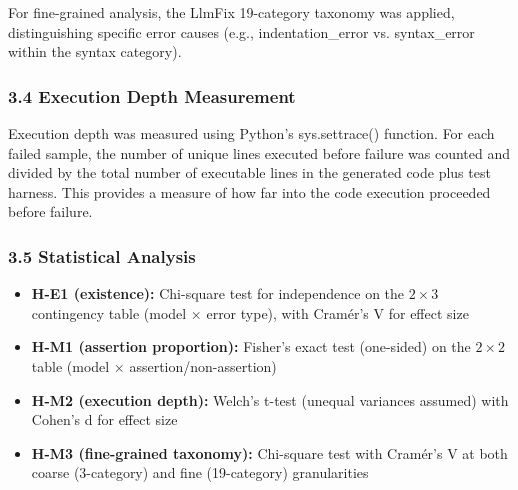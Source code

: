 For fine-grained analysis, the LlmFix 19-category taxonomy was applied, distinguishing specific error causes (e.g., indentation\_error vs. syntax\_error within the syntax category).

\subsubsection{3.4 Execution Depth Measurement}

Execution depth was measured using Python's sys.settrace() function. For each failed sample, the number of unique lines executed before failure was counted and divided by the total number of executable lines in the generated code plus test harness. This provides a measure of how far into the code execution proceeded before failure.

\subsubsection{3.5 Statistical Analysis}

\begin{itemize}
\item \textbf{H-E1 (existence):} Chi-square test for independence on the $2\times 3$ contingency table (model $\times$ error type), with Cramér's V for effect size
\item \textbf{H-M1 (assertion proportion):} Fisher's exact test (one-sided) on the $2\times 2$ table (model $\times$ assertion/non-assertion)
\item \textbf{H-M2 (execution depth):} Welch's t-test (unequal variances assumed) with Cohen's d for effect size
\item \textbf{H-M3 (fine-grained taxonomy):} Chi-square test with Cramér's V at both coarse (3-category) and fine (19-category) granularities
\end{itemize}
